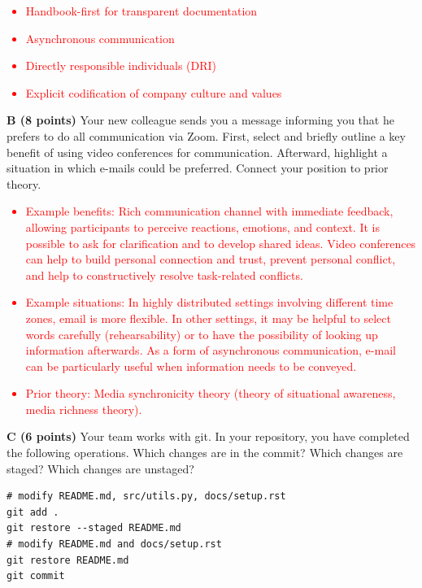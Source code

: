 \documentclass[12pt]{scrartcl}
\begin{document}
\textcolor{red}{
	\begin{itemize}
		\item Handbook-first for transparent documentation
		\item Asynchronous communication
		\item Directly responsible individuals (DRI)
		\item Explicit codification of company culture and values
	\end{itemize}
}

\vspace{0.3cm}

\textbf{B (8 points)} Your new colleague sends you a message informing you that he prefers to do all communication via Zoom. First, select and briefly outline a key benefit of using video conferences for communication. Afterward, highlight a situation in which e-mails could be preferred. Connect your position to prior theory.

\textcolor{red}{
	\begin{itemize}
		\item Example benefits: Rich communication channel with immediate feedback, allowing participants to perceive reactions, emotions, and context. It is possible to ask for clarification and to develop shared ideas. Video conferences can help to build personal connection and trust, prevent personal conflict, and help to constructively resolve task-related conflicts.
		\item Example situations: In highly distributed settings involving different time zones, email is more flexible. In other settings, it may be helpful to select words carefully (rehearsability) or to have the possibility of looking up information afterwards. As a form of asynchronous communication, e-mail can be particularly useful when information needs to be conveyed.
		\item Prior theory: Media synchronicity theory (theory of situational awareness, media richness theory).
	\end{itemize}
}

\newpage

\textbf{C (6 points)} Your team works with git. In your repository, you have completed the following operations. Which changes are in the commit? Which changes are staged? Which changes are unstaged?

\begin{verbatim}
# modify README.md, src/utils.py, docs/setup.rst
git add .
git restore --staged README.md
# modify README.md and docs/setup.rst
git restore README.md
git commit
\end{verbatim}
\vspace{0.3cm}
\end{document}

